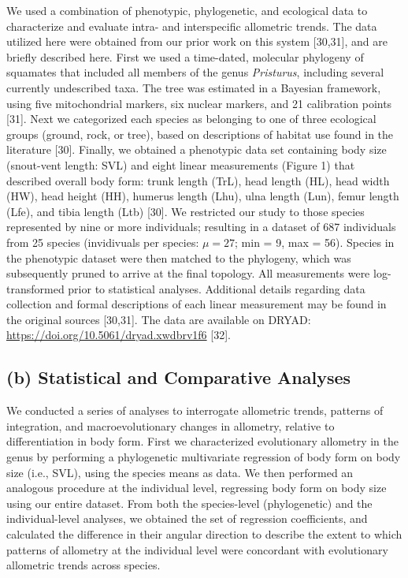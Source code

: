 \documentclass[
  11pt,
]{article}
\begin{document}
We used a combination of phenotypic, phylogenetic, and ecological data
to characterize and evaluate intra- and interspecific allometric trends.
The data utilized here were obtained from our prior work on this system
{[}30,31{]}, and are briefly described here. First we used a time-dated,
molecular phylogeny of squamates that included all members of the genus
\emph{Pristurus}, including several currently undescribed taxa. The tree
was estimated in a Bayesian framework, using five mitochondrial markers,
six nuclear markers, and 21 calibration points {[}31{]}. Next we
categorized each species as belonging to one of three ecological groups
(ground, rock, or tree), based on descriptions of habitat use found in
the literature {[}30{]}. Finally, we obtained a phenotypic data set
containing body size (snout-vent length: SVL) and eight linear
measurements (Figure 1) that described overall body form: trunk length
(TrL), head length (HL), head width (HW), head height (HH), humerus
length (Lhu), ulna length (Lun), femur length (Lfe), and tibia length
(Ltb) {[}30{]}. We restricted our study to those species represented by
nine or more individuals; resulting in a dataset of 687 individuals from
25 species (invidivuals per species: \(\mu=27\); min = 9, max = 56).
Species in the phenotypic dataset were then matched to the phylogeny,
which was subsequently pruned to arrive at the final topology. All
measurements were log-transformed prior to statistical analyses.
Additional details regarding data collection and formal descriptions of
each linear measurement may be found in the original sources
{[}30,31{]}. The data are available on DRYAD:
\url{https://doi.org/10.5061/dryad.xwdbrv1f6} {[}32{]}.

\hypertarget{b-statistical-and-comparative-analyses}{%
\subsection{(b) Statistical and Comparative
Analyses}\label{b-statistical-and-comparative-analyses}}

We conducted a series of analyses to interrogate allometric trends,
patterns of integration, and macroevolutionary changes in allometry,
relative to differentiation in body form. First we characterized
evolutionary allometry in the genus by performing a phylogenetic
multivariate regression of body form on body size (i.e., SVL), using the
species means as data. We then performed an analogous procedure at the
individual level, regressing body form on body size using our entire
dataset. From both the species-level (phylogenetic) and the
individual-level analyses, we obtained the set of regression
coefficients, and calculated the difference in their angular direction
to describe the extent to which patterns of allometry at the individual
level were concordant with evolutionary allometric trends across
species. \hfill\break
\end{document}
